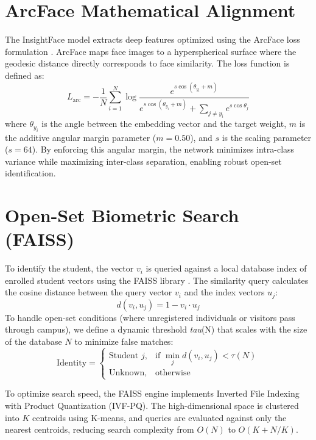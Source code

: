 \documentclass[12pt,a4paper,oneside]{report}
\begin{document}
\section{ArcFace Mathematical Alignment}
The InsightFace model extracts deep features optimized using the ArcFace loss formulation \cite{deng2019arcface}. ArcFace maps face images to a hyperspherical surface where the geodesic distance directly corresponds to face similarity. The loss function is defined as:
\begin{equation}
    L_{\text{arc}} = -\frac{1}{N} \sum_{i=1}^{N} \log \frac{e^{s \cos(\theta_{y_i} + m)}}{e^{s \cos(\theta_{y_i} + m)} + \sum_{j \neq y_i} e^{s \cos \theta_j}}
\end{equation}
where $\theta_{y_i}$ is the angle between the embedding vector and the target weight, $m$ is the additive angular margin parameter ($m=0.50$), and $s$ is the scaling parameter ($s=64$). By enforcing this angular margin, the network minimizes intra-class variance while maximizing inter-class separation, enabling robust open-set identification.

\section{Open-Set Biometric Search (FAISS)}
To identify the student, the vector $v_i$ is queried against a local database index of enrolled student vectors using the FAISS library \cite{johnson2019billion}. The similarity query calculates the cosine distance between the query vector $v_i$ and the index vectors $u_j$:
\begin{equation}
    d(v_i, u_j) = 1 - v_i \cdot u_j
\end{equation}
To handle open-set conditions (where unregistered individuals or visitors pass through campus), we define a dynamic threshold \textit{tau}(N) that scales with the size of the database $N$ to minimize false matches:
\begin{equation}
    \text{Identity} = \begin{cases}
        \text{Student } j, & \text{if } \min_j d(v_i, u_j) < \tau(N) \\
        \text{Unknown}, & \text{otherwise}
    \end{cases}
\end{equation}

To optimize search speed, the FAISS engine implements Inverted File Indexing with Product Quantization (IVF-PQ). The high-dimensional space is clustered into $K$ centroids using K-means, and queries are evaluated against only the nearest centroids, reducing search complexity from $O(N)$ to $O(K + N/K)$.
\end{document}

